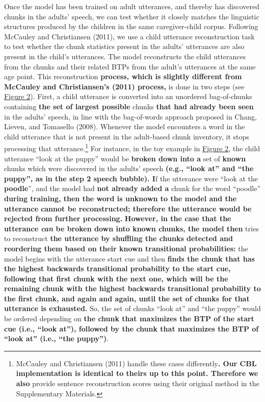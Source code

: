 \documentclass[man,mask,floatsintext]{apa6}
\let\rmarkdownfootnote\footnote%
\def\footnote{\protect\rmarkdownfootnote}
\begin{document}
Once the model has been trained on adult utterances, and thereby has
discovered chunks in the adults' speech, we can test whether it closely
matches the linguistic structures produced by the children in the same
caregiver-child corpus. Following McCauley and Christiansen (2011), we
use a child utterance reconstruction task to test whether the chunk
statistics present in the adults' utterances are also present in the
child's utterances. The model reconstructs the child utterances from the
chunks and their related BTPs from the adult's utterances at the same
age point. This reconstruction \textbf{process, which is slightly
different from McCauley and Christiansen's (2011) process,} is done in
two steps (see \protect\hyperlink{fig2}{Figure 2}). First, a child
utterance is converted into an unordered bag-of-chunks containing
\textbf{the set of largest possible} chunks \textbf{that had already
been seen} in the adults' speech, in line with the bag-of-words approach
proposed in Chang, Lieven, and Tomasello (2008). Whenever the model
encounters a word in the child utterance that is not present in the
adult-based chunk inventory, it stops processing that
utterance.\footnote{McCauley and Christiansen (2011) handle these cases
  differently\textbf{. Our CBL implementation is identical to theirs up
  to this point. Therefore we also} provide sentence reconstruction
  scores using their original method in the Supplementary Materials.}
For instance, in the toy example in \protect\hyperlink{fig2}{Figure 2},
the child utterance \enquote{look at the puppy} would be \textbf{broken
down into a} set of \textbf{known} chunks which were discovered in the
adults' speech \textbf{(e.g., \enquote{look at} and \enquote{the puppy},
as in the step 2 speech bubble). I}f the utterance were \enquote{look at
the \textbf{poodle}}, and the model had \textbf{not already added a}
chunk for the word \enquote{poodle} \textbf{during training, then the
word is unknown to the model and the utterance cannot be reconstructed;
therefore the utterance would be rejected from further processing.}
\textbf{However, in the case that the utterance \emph{can} be broken
down into known chunks, the model then} tries to reconstruct \textbf{the
utterance by shuffling the chunks detected and reordering them based on
their known transitional probabilities:} the model begins with the
utterance start cue and then \textbf{finds the chunk that has the
highest backwards transitional probability to the start cue, following
that first chunk with the next one, which will be the remaining chunk
with the highest backwards transitional probability to the first chunk,
and again and again, until the set of chunks for that utterance is
exhausted.} So, the set of chunks \enquote{look at} and \enquote{the
puppy} would be ordered depending on \textbf{the chunk that maximizes
the BTP of the start cue (i.e., \enquote{look at}), followed by the
chunk that maximizes the BTP of \enquote{look at} (i.e., \enquote{the
puppy})}.
\end{document}
